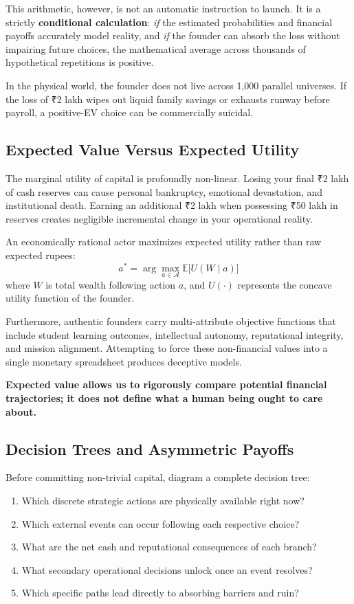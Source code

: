 This arithmetic, however, is not an automatic instruction to launch. It is a strictly \textbf{conditional calculation}: \textit{if} the estimated probabilities and financial payoffs accurately model reality, and \textit{if} the founder can absorb the loss without impairing future choices, the mathematical average across thousands of hypothetical repetitions is positive.

In the physical world, the founder does not live across 1,000 parallel universes. If the loss of ₹2 lakh wipes out liquid family savings or exhausts runway before payroll, a positive-EV choice can be commercially suicidal.

\subsection{Expected Value Versus Expected Utility}

The marginal utility of capital is profoundly non-linear. Losing your final ₹2 lakh of cash reserves can cause personal bankruptcy, emotional devastation, and institutional death. Earning an additional ₹2 lakh when possessing ₹50 lakh in reserves creates negligible incremental change in your operational reality.

An economically rational actor maximizes expected utility rather than raw expected rupees:
\begin{equation}
a^* = \arg\max_{a \in \mathcal{A}} \mathbb{E}\big[U(W \mid a)\big]
\end{equation}
where $W$ is total wealth following action $a$, and $U(\cdot)$ represents the concave utility function of the founder.

Furthermore, authentic founders carry multi-attribute objective functions that include student learning outcomes, intellectual autonomy, reputational integrity, and mission alignment. Attempting to force these non-financial values into a single monetary spreadsheet produces deceptive models.

\textbf{Expected value allows us to rigorously compare potential financial trajectories; it does not define what a human being ought to care about.}

\subsection{Decision Trees and Asymmetric Payoffs}

Before committing non-trivial capital, diagram a complete decision tree:
\begin{enumerate}[leftmargin=12pt,itemsep=2pt,topsep=1pt,parsep=0pt]
  \item Which discrete strategic actions are physically available right now?
  \item Which external events can occur following each respective choice?
  \item What are the net cash and reputational consequences of each branch?
  \item What secondary operational decisions unlock once an event resolves?
  \item Which specific paths lead directly to absorbing barriers and ruin?
\end{enumerate}

